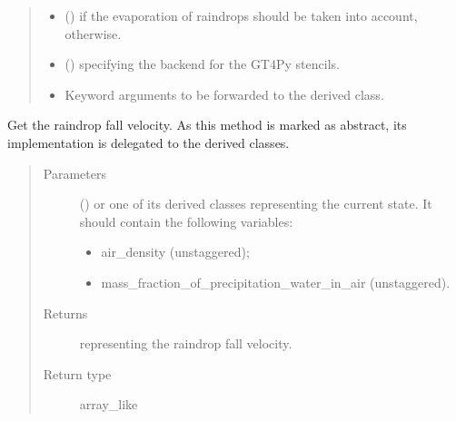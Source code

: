 \documentclass[letterpaper,10pt,english]{sphinxmanual}
\begin{document}
\begin{fulllineitems}
\begin{fulllineitems}
\begin{quote}
\begin{description}
\begin{itemize}
\item {} 
 () \textendash{}  if the evaporation of raindrops should be taken into account,  otherwise.

\item {} 
 () \textendash{}  specifying the backend for the GT4Py stencils.

\item {} 
 \textendash{} Keyword arguments to be forwarded to the derived class.

\end{itemize}

\end{description}\end{quote}

\end{fulllineitems}


\begin{fulllineitems}
\label{\detokenize{api:parameterizations.slow_tendencies.SlowTendencyMicrophysics.get_raindrop_fall_velocity}}
Get the raindrop fall velocity.
As this method is marked as abstract, its implementation is delegated to the derived classes.
\begin{quote}\begin{description}
\item[{Parameters}] \leavevmode
{} () \textendash{} 
{\hyperref[\detokenize{api:storages.grid_data.GridData}]{}} or one of its derived classes representing the current state.
It should contain the following variables:
\begin{itemize}
\item {} 
air\_density (unstaggered);

\item {} 
mass\_fraction\_of\_precipitation\_water\_in\_air (unstaggered).

\end{itemize}


\item[{Returns}] \leavevmode
{} representing the raindrop fall velocity.

\item[{Return type}] \leavevmode
array\_like

\end{description}\end{quote}

\end{fulllineitems}


\end{fulllineitems}
\end{document}
